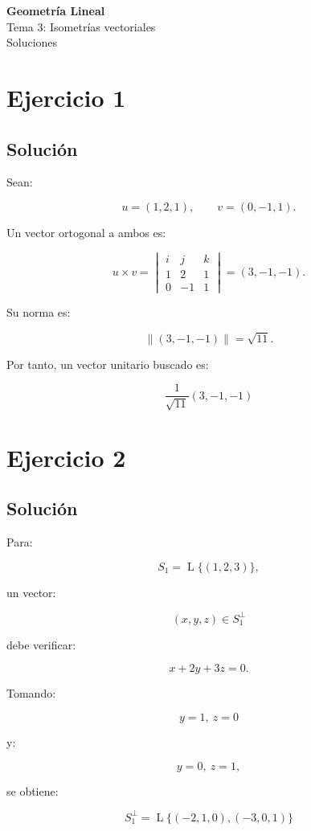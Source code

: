 \documentclass[11pt,a4paper]{article}
\newcommand{\Span}{\operatorname{L}}
\begin{document}
\begin{center}
{\LARGE\bfseries Geometría Lineal}\\[0.4em]
{\Large Tema 3: Isometrías vectoriales}\\[0.4em]
{\large Soluciones}
\end{center}

\section{Ejercicio 1}
\subsection{Solución}

Sean:

\[
u=(1,2,1),
\qquad
v=(0,-1,1).
\]

Un vector ortogonal a ambos es:

\[
u\times v
=
\begin{vmatrix}
i&j&k\\
1&2&1\\
0&-1&1
\end{vmatrix}
=
(3,-1,-1).
\]

Su norma es:

\[
\|(3,-1,-1)\|
=
\sqrt{11}.
\]

Por tanto, un vector unitario buscado es:

\[
\boxed{
\frac1{\sqrt{11}}(3,-1,-1)
}
\]

\section{Ejercicio 2}
\subsection{Solución}

Para:

\[
S_1=\Span\{(1,2,3)\},
\]

un vector:

\[
(x,y,z)\in S_1^\perp
\]

debe verificar:

\[
x+2y+3z=0.
\]

Tomando:

\[
y=1,\ z=0
\]

y:

\[
y=0,\ z=1,
\]

se obtiene:

\[
\boxed{
S_1^\perp
=
\Span\{(-2,1,0),(-3,0,1)\}
}
\]
\end{document}
